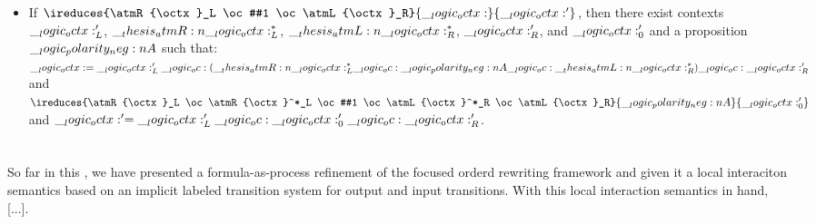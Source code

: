   \begin{itemize}
  \item 
    If $\ireduces{\atmR{\octx}_L \oc #1 \oc \atmL{\octx}_R}{\octx}{\octx'}$, then there exist contexts $\__logic_octx:'_L$, $\__thesis_atmR:n {\__logic_octx:}^*_L$, $\__thesis_atmL:n {\__logic_octx:}^*_R$, $\__logic_octx:'_R$, and $\__logic_octx:'_0$ and a proposition $\__logic_polarity_neg:n {A}$ such that: $\__logic_octx: = \__logic_octx:'_L \__logic_oc: (\__thesis_atmR:n {\__logic_octx:}^*_L \__logic_oc: \__logic_polarity_neg:n {A} \__logic_oc: \__thesis_atmL:n {\__logic_octx:}^*_R) \__logic_oc: \__logic_octx:'_R$ and $\ireduces{\atmR{\octx}_L \oc \atmR{\octx}^*_L \oc #1 \oc \atmL{\octx}^*_R \oc \atmL{\octx}_R}{\n{A}}{\octx'_0}$ and $\__logic_octx:' = \__logic_octx:'_L \__logic_oc: \__logic_octx:'_0 \__logic_oc: \__logic_octx:'_R$.
  \end{itemize}

\clearpage
\section{}

So far in this , we have presented a formula-as-process refinement of the focused orderd rewriting framework and given it a local interaciton semantics based on an implicit labeled transition system for output and input transitions.
With this local interaction semantics in hand, [...].

